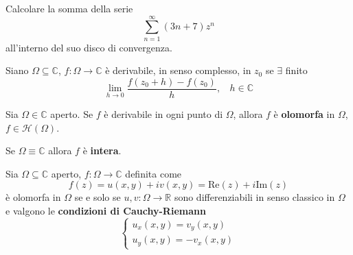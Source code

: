 Calcolare la somma della serie
\begin{equation*}
\sum\limits ^{\infty }_{n=1}\left( 3n+7\right) z^{n}
\end{equation*}
all'interno del suo disco di convergenza.
\ParteSoluzioni
\Soluzione
\begin{defn}
Siano $\Omega \subseteq \mathbb{C}$, $f:\Omega \rightarrow \mathbb{C}$ è derivabile, in senso complesso, in $z_{0}$ se $\exists $ finito
\begin{equation*}
\lim\limits _{h\rightarrow 0}\frac{f\left( z_{0} +h\right) -f\left( z_{0}\right)}{h} ,\ \ \ \ h\in \mathbb{C}
\end{equation*}
\end{defn}
\begin{defn}
Sia $\Omega \in \mathbb{C}$ aperto. Se $f$ è derivabile in ogni punto di $\Omega $, allora $f$ è \textbf{olomorfa} in $\Omega $, $f\in \mathcal{H}\left( \Omega \right)$.
\end{defn}
\begin{rem}
Se $\Omega \equiv \mathbb{C}$ allora $f$ è \textbf{intera}.
\end{rem}
\begin{thm}
 Sia $\Omega \subseteq \mathbb{C}$ aperto, $f:\Omega \rightarrow \mathbb{C}$ definita come
\begin{equation*}
f\left( z\right) =u\left( x,y\right) +iv\left( x,y\right) =\mathrm{Re}\left( z\right) +i\mathrm{Im}\left( z\right)
\end{equation*}
è olomorfa in $\Omega $ se e solo se $u,v:\Omega \rightarrow \mathbb{R}$ sono differenziabili in senso classico in $\Omega $ e valgono le \textbf{condizioni di Cauchy-Riemann}
\begin{equation}
\begin{cases}
u_{x}\left( x,y\right) =v_{y}\left( x,y\right)\\
u_{y}\left( x,y\right) =-v_{x}\left( x,y\right)
\end{cases}
\end{equation}
\end{thm}
